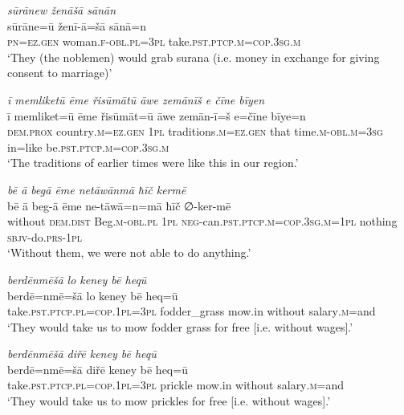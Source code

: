 \ea \label{RE.59}
\textit{sūrānew ženāšā sānān} \\ 
\gll sūrāne=ū ženī-ā=šā sānā=n \\ 
 \textsc{pn}\textsc{=ez.gen} woman\textsc{.f}\textsc{-obl}\textsc{.pl}\textsc{=3pl} take\textsc{.pst}\textsc{.ptcp}\textsc{.m}\textsc{=cop}\textsc{.3sg}\textsc{.m} \\ 
\glt `They (the noblemen) would grab surana (i.e. money in exchange for giving consent to marriage)'
\z 
 
\ea \label{RE.62}
\textit{ī memliketū ēme řisūmātū āwe zemānīš e čīne bīyen} \\ 
\gll ī memliket=ū ēme řisūmāt=ū āwe zemān-ī=š e=čīne bīye=n \\ 
 \textsc{dem.prox} country\textsc{.m}\textsc{=ez.gen} \textsc{1pl} traditions\textsc{.m}\textsc{=ez.gen} that time\textsc{.m}\textsc{-obl}\textsc{.m}\textsc{=3sg} in=like be\textsc{.pst}\textsc{.ptcp}\textsc{.m}\textsc{=cop}\textsc{.3sg}\textsc{.m} \\ 
\glt `The traditions of earlier times were like this in our region.'
\z 
 
\ea \label{RE.64}
\textit{bē ā begā ēme netāwānmā ħīč kermē} \\ 
\gll bē ā beg-ā ēme ne-tāwā=n=mā ħīč ∅-ker-mē \\ 
 without \textsc{dem.dist} Beg\textsc{.m}\textsc{-obl}\textsc{.pl} \textsc{1pl} \textsc{neg-}can\textsc{.pst}\textsc{.ptcp}\textsc{.m}\textsc{=cop}\textsc{.3sg}\textsc{.m}\textsc{=\textsc{1pl}} nothing \textsc{sbjv-}do\textsc{.prs}\textsc{-\textsc{1pl}} \\ 
\glt `Without them, we were not able to do anything.'
\z 
 
\ea \label{RE.65}
\textit{berdēnmēšā lo keney bē heqū} \\ 
\gll berdē=nmē=šā lo keney bē heq=ū \\ 
 take\textsc{.pst}\textsc{.ptcp}\textsc{.pl}\textsc{=cop}\textsc{.\textsc{1pl}}\textsc{=3pl} fodder\_grass mow.in without salary\textsc{.m}=and \\ 
\glt `They would take us to mow fodder grass for free [i.e. without wages].'
\z 
 
\ea \label{RE.66}
\textit{berdēnmēšā diřē keney bē heqū} \\ 
\gll berdē=nmē=šā diřē keney bē heq=ū \\ 
 take\textsc{.pst}\textsc{.ptcp}\textsc{.pl}\textsc{=cop}\textsc{.\textsc{1pl}}\textsc{=3pl} prickle mow.in without salary\textsc{.m}=and \\ 
\glt `They would take us to mow prickles for free [i.e. without wages].'
\z 
 
